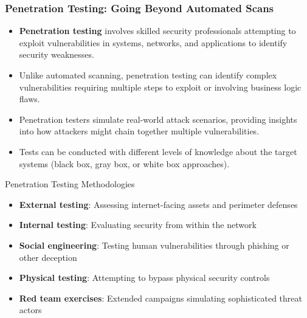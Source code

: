\documentclass{beamer}
\begin{document}
\begin{frame}
\frametitle{Penetration Testing: Going Beyond Automated Scans}
\begin{itemize}
\item \textbf{Penetration testing} involves skilled security professionals attempting to exploit vulnerabilities in systems, networks, and applications to identify security weaknesses.
\item Unlike automated scanning, penetration testing can identify complex vulnerabilities requiring multiple steps to exploit or involving business logic flaws.
\item Penetration testers simulate real-world attack scenarios, providing insights into how attackers might chain together multiple vulnerabilities.
\item Tests can be conducted with different levels of knowledge about the target systems (black box, gray box, or white box approaches).
\end{itemize}

\begin{block}{Penetration Testing Methodologies}
\tiny
\begin{itemize}
\item \textbf{External testing}: Assessing internet-facing assets and perimeter defenses
\item \textbf{Internal testing}: Evaluating security from within the network
\item \textbf{Social engineering}: Testing human vulnerabilities through phishing or other deception
\item \textbf{Physical testing}: Attempting to bypass physical security controls
\item \textbf{Red team exercises}: Extended campaigns simulating sophisticated threat actors
\end{itemize}
\end{block}
\end{frame}
\end{document}
